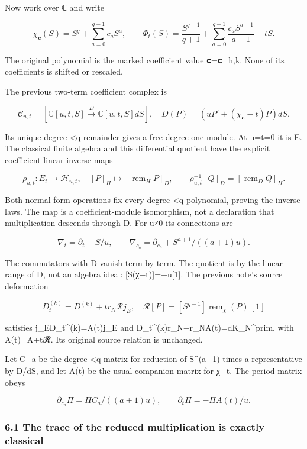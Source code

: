 Now work over ℂ and write

\[
\chi_{\mathbf c}(S)=S^q+\sum_{a=0}^{q-1}c_aS^a,
\qquad
\Phi_t(S)=\frac{S^{q+1}}{q+1}
 +\sum_{a=0}^{q-1}\frac{c_aS^{a+1}}{a+1}-tS.
\tag{27}
\]

The original polynomial is the marked coefficient value 𝐜=𝐜\_h,k. None of its coefficients is shifted or rescaled.

The previous two-term coefficient complex is

\[
\mathcal C_{u,t}=[\mathbb C[u,t,S]\xrightarrow{D}\mathbb C[u,t,S]dS],
\quad D(P)=(uP'+(\chi_{\mathbf c}-t)P)dS.
\tag{28}
\]

Its unique degree-\textless q remainder gives a free degree-one module. At u=t=0 it is E. The classical finite algebra and this differential quotient have the explicit coefficient-linear inverse maps

\[
\rho_{u,t}:E_t\longrightarrow\mathcal H_{u,t},\quad
[P]_H\longmapsto[\operatorname{rem}_H P]_D,
\qquad
\rho_{u,t}^{-1}[Q]_D=[\operatorname{rem}_D Q]_H.
\tag{28a}
\]

Both normal-form operations fix every degree-\textless q polynomial, proving the inverse laws. The map is a coefficient-module isomorphism, not a declaration that multiplication descends through D. For u≠0 its connections are

\[
\nabla_t=\partial_t-S/u,
\qquad
\nabla_{c_a}=\partial_{c_a}+S^{a+1}/((a+1)u).
\tag{29}
\]

The commutators with D vanish term by term. The quotient is by the linear range of D, not an algebra ideal: {[}S(χ−t){]}=−u{[}1{]}. The previous note's source deformation

\[
D_t^{(k)}=D^{(k)}+t r_N\mathcal R j_E,
\quad\mathcal R[P]=[S^{q-1}]\operatorname{rem}_\chi(P)\,[1]
\tag{30}
\]

satisfies j\_ED\_t\^{}(k)=A(t)j\_E and D\_t\^{}(k)r\_N−r\_NA(t)=dK\_N\^{}prim, with A(t)=A+t𝓡. Its original source relation is unchanged.

Let C\_a be the degree-\textless q matrix for reduction of S\^{}(a+1) times a representative by D/dS, and let A(t) be the usual companion matrix for χ−t. The period matrix obeys

\[
\partial_{c_a}\Pi=\Pi C_a/((a+1)u),
\qquad \partial_t\Pi=-\Pi A(t)/u.
\tag{31}
\]

\subsubsection{6.1 The trace of the reduced multiplication is exactly classical}\label{endpoint-sga_trace_period--the-trace-of-the-reduced-multiplication-is-exactly-classical}


